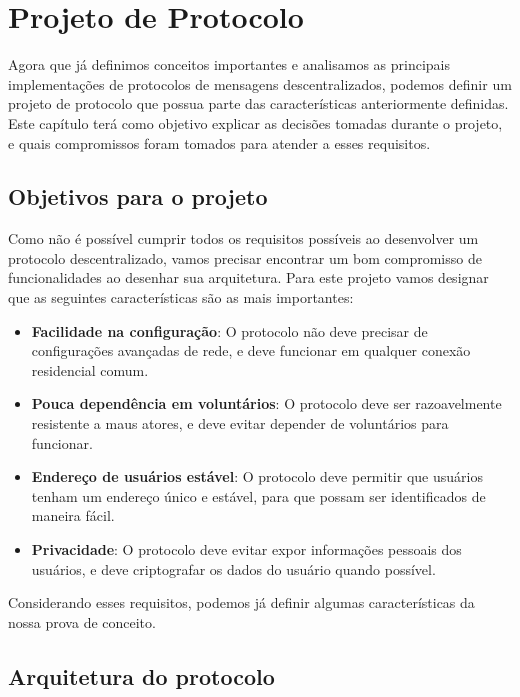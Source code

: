 
\chapter{Projeto de Protocolo}

Agora que já definimos conceitos importantes e analisamos as principais implementações de protocolos de mensagens descentralizados, podemos definir um projeto de protocolo que possua parte das características anteriormente definidas. Este capítulo terá como objetivo explicar as decisões tomadas durante o projeto, e quais compromissos foram tomados para atender a esses requisitos.

\section{Objetivos para o projeto}

Como não é possível cumprir todos os requisitos possíveis ao desenvolver um protocolo descentralizado, vamos precisar encontrar um bom compromisso de funcionalidades ao desenhar sua arquitetura. Para este projeto vamos designar que as seguintes características são as mais importantes:

\begin{itemize}
    \item \textbf{Facilidade na configuração}: O protocolo não deve precisar de configurações avançadas de rede, e deve funcionar em qualquer conexão residencial comum.
    \item \textbf{Pouca dependência em voluntários}: O protocolo deve ser razoavelmente resistente a maus atores, e deve evitar depender de voluntários para funcionar.
    \item \textbf{Endereço de usuários estável}: O protocolo deve permitir que usuários tenham um endereço único e estável, para que possam ser identificados de maneira fácil.
    \item \textbf{Privacidade}: O protocolo deve evitar expor informações pessoais dos usuários, e deve criptografar os dados do usuário quando possível.
\end{itemize}

Considerando esses requisitos, podemos já definir algumas características da nossa prova de conceito. 

\section{Arquitetura do protocolo}

